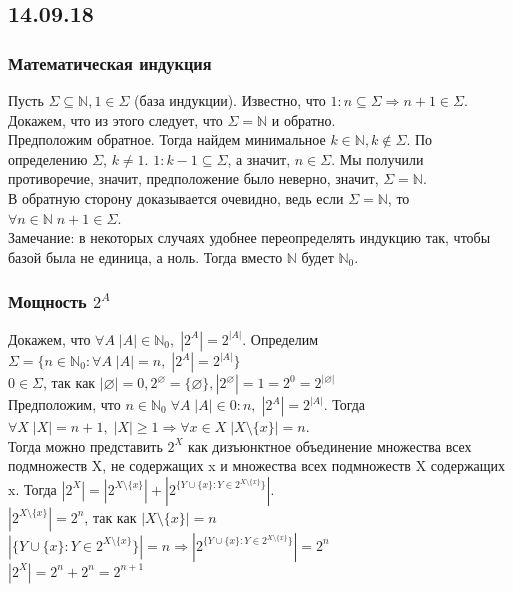 \subsection{14.09.18}
\subsubsection{Математическая индукция}
Пусть $\Sigma \subseteq \mathbb{N}, 1 \in \Sigma$ (база индукции). Известно, что $1:n \subseteq \Sigma \Rightarrow n + 1 \in \Sigma$. Докажем, что из этого следует, что $\Sigma = \mathbb{N}$ и обратно.\\
Предположим обратное. Тогда найдем минимальное $k \in \mathbb{N}, k \not\in \Sigma$. По определению $\Sigma$, $k \not= 1$. $1:k - 1 \subseteq \Sigma$, а значит, $n \in \Sigma$. Мы получили противоречие, значит, предположение было неверно, значит, $\Sigma = \mathbb{N}$.\\
В обратную сторону доказывается очевидно, ведь если $\Sigma = \mathbb{N}$, то $\forall n \in \mathbb{N} \; n + 1 \in \Sigma$.\\
Замечание: в некоторых случаях удобнее переопределять индукцию так, чтобы базой была не единица, а ноль. Тогда вместо $\mathbb{N}$ будет $\mathbb{N}_0$.
\subsubsection{Мощность $2^A$}
Докажем, что $\forall A \; |A| \in \mathbb{N}_0 , \; |2^A| = 2^{|A|}$. Определим $\Sigma = \{n \in \mathbb{N}_0 : \forall A \; |A| = n , \; |2^A| = 2^{|A|}\}$\\
$0 \in \Sigma$, так как $|\varnothing| = 0, 2^{\varnothing} = \{\varnothing\}, |2^{\varnothing}| = 1 = 2^0 = 2^{|\varnothing|}$ \\
Предположим, что $n \in \mathbb{N}_0 \; \forall A \; |A| \in 0:n , \; |2^A| = 2^{|A|}$. Тогда $\forall X \;  |X| = n + 1 , \; |X| \geq 1 \Rightarrow \forall x \in X \; |X \setminus \{x\}| = n$. \\
Тогда можно представить $2^X$ как дизъюнктное объединение множества всех подмножеств X, не содержащих x и множества всех подмножеств X содержащих x. Тогда $|2^X| = |2^{X \setminus \{x\}}| + |2^{\{Y \cup \{x\} : Y \in 2^{X \setminus \{x\}}\}}|$. \\
$|2^{X \setminus \{x\}}| = 2^n$, так как $|X \setminus \{x\}| = n$ \\
$|\{Y \cup \{x\} : Y \in 2^{X \setminus \{x\}}\}| = n \Rightarrow |2^{\{Y \cup \{x\} : Y \in 2^{X \setminus \{x\}}\}}| = 2^n$ \\
$|2^X| = 2^n + 2^n = 2^{n + 1}$
